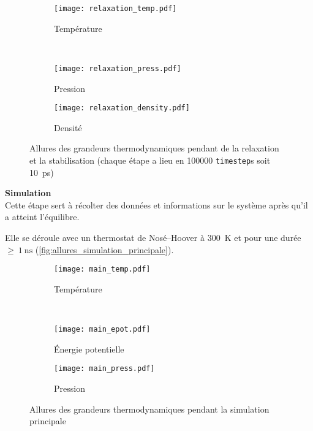 \begin{figure}[h]
    \centering
    \begin{subfigure}[t]{.49\textwidth}
        \texttt{[image: relaxation\_temp.pdf]}
        \caption{Température}
    \end{subfigure}%
    ~
    \begin{subfigure}[t]{.49\textwidth}
        \texttt{[image: relaxation\_press.pdf]}
        \caption{Pression}
    \end{subfigure}
    \begin{subfigure}[t]{.49\textwidth}
        \texttt{[image: relaxation\_density.pdf]}
        \caption{Densité}
    \end{subfigure}
    \caption{Allures des grandeurs thermodynamiques pendant de la relaxation et la stabilisation {\tiny (chaque étape a lieu en \num{100000} \lstinline!timestep!s soit \qty{10}{\pico \second})}}
    \label{fig:allures_thermostat_barostat}
\end{figure}

\textbf{Simulation}\\
Cette étape sert à récolter des données et informations sur le système après qu'il a atteint l'équilibre.

Elle se déroule avec un thermostat de Nosé--Hoover à \qty{300}{\kelvin} et pour une durée $\geq~\qty{1}{\nano \second}$ (\autoref{fig:allures_simulation_principale}).

\begin{figure}[h]
    \centering
    \begin{subfigure}[t]{.49\textwidth}
        \texttt{[image: main\_temp.pdf]}
        \caption{Température}
    \end{subfigure}%
    ~
    \begin{subfigure}[t]{.49\textwidth}
        \texttt{[image: main\_epot.pdf]}
        \caption{Énergie potentielle}
    \end{subfigure}
    \begin{subfigure}[t]{.49\textwidth}
        \texttt{[image: main\_press.pdf]}
        \caption{Pression}
    \end{subfigure}
    \caption{Allures des grandeurs thermodynamiques pendant la simulation principale}
    \label{fig:allures_simulation_principale}
\end{figure}
